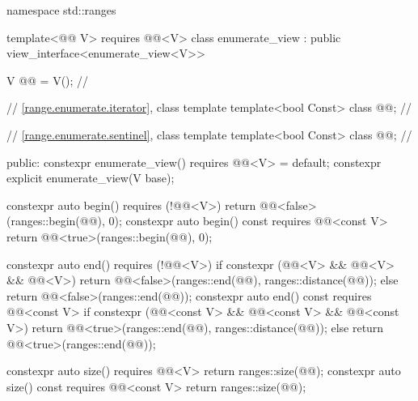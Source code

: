%
%
%
%
\begin{codeblock}
namespace std::ranges {
  template<@@ V>
    requires @@<V>
  class enumerate_view : public view_interface<enumerate_view<V>> {
    V @@ = V();                                    // \expos

    // \ref{range.enumerate.iterator}, class template 
    template<bool Const>
      class @@;                                 // \expos

    // \ref{range.enumerate.sentinel}, class template 
    template<bool Const>
      class @@;                                 // \expos

  public:
    constexpr enumerate_view() requires @@<V> = default;
    constexpr explicit enumerate_view(V base);

    constexpr auto begin() requires (!@@<V>)
    { return @@<false>(ranges::begin(@@), 0); }
    constexpr auto begin() const requires @@<const V>
    { return @@<true>(ranges::begin(@@), 0); }

    constexpr auto end() requires (!@@<V>) {
      if constexpr (@@<V> && @@<V> && @@<V>)
        return @@<false>(ranges::end(@@), ranges::distance(@@));
      else
        return @@<false>(ranges::end(@@));
    }
    constexpr auto end() const requires @@<const V> {
      if constexpr (@@<const V> && @@<const V> && @@<const V>)
        return @@<true>(ranges::end(@@), ranges::distance(@@));
      else
        return @@<true>(ranges::end(@@));
    }

    constexpr auto size() requires @@<V>
    { return ranges::size(@@); }
    constexpr auto size() const requires @@<const V>
    { return ranges::size(@@); }

}}
\end{codeblock}
